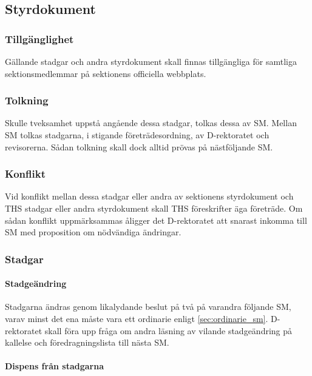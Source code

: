 \documentclass{dgovdoc}
\begin{document}
\subsection{Styrdokument}
\label{sec:styrdokument}

\subsubsection{Tillgänglighet}

Gällande stadgar och andra styrdokument skall finnas tillgängliga för samtliga
sektionsmedlemmar på sektionens officiella webbplats.

\subsubsection{Tolkning}

Skulle tveksamhet uppstå angående dessa stadgar, tolkas dessa av SM. Mellan SM
tolkas stadgarna, i stigande företrädesordning, av D-rektoratet och
revisorerna. Sådan tolkning skall dock alltid prövas på nästföljande SM.

\subsubsection{Konflikt}

Vid konflikt mellan dessa stadgar eller andra av sektionens styrdokument och
THS stadgar eller andra styrdokument skall THS föreskrifter äga företräde. Om
sådan konflikt uppmärksammas åligger det D-rektoratet att snarast inkomma till
SM med proposition om nödvändiga ändringar.

\subsubsection{Stadgar}

\paragraph{Stadgeändring}

Stadgarna ändras genom likalydande beslut på två på varandra följande SM, varav
minst det ena måste vara ett ordinarie enligt \ref{sec:ordinarie_sm}.
D-rektoratet skall föra upp fråga om andra läsning av vilande stadgeändring på
kallelse och föredragningslista till nästa SM.

\paragraph{Dispens från stadgarna}
\end{document}
